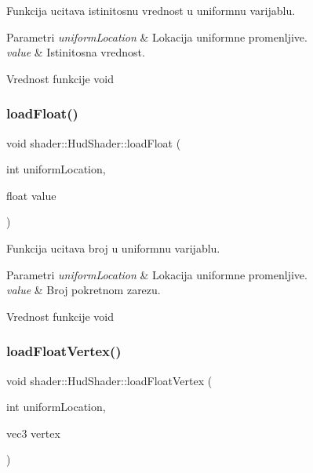Funkcija ucitava istinitosnu vrednost u uniformnu varijablu. 


\begin{DoxyParams}{Parametri}
{\em uniform\+Location} & Lokacija uniformne promenljive. \\
\hline
{\em value} & Istinitosna vrednost. \\
\hline
\end{DoxyParams}
\begin{DoxyReturn}{Vrednost funkcije}
void 
\end{DoxyReturn}
\mbox{\label{classshader_1_1HudShader_ac184470cfd0979bc13fc7571d9e0b310}} 
\subsubsection{\texorpdfstring{load\+Float()}{loadFloat()}}
{\footnotesize\ttfamily void shader\+::\+Hud\+Shader\+::load\+Float (\begin{DoxyParamCaption}\item[{int}]{uniform\+Location,  }\item[{float}]{value }\end{DoxyParamCaption})}



Funkcija ucitava broj u uniformnu varijablu. 


\begin{DoxyParams}{Parametri}
{\em uniform\+Location} & Lokacija uniformne promenljive. \\
\hline
{\em value} & Broj pokretnom zarezu. \\
\hline
\end{DoxyParams}
\begin{DoxyReturn}{Vrednost funkcije}
void 
\end{DoxyReturn}
\mbox{\label{classshader_1_1HudShader_a5bfee0570129124b25d570310b18c5e5}} 
\subsubsection{\texorpdfstring{load\+Float\+Vertex()}{loadFloatVertex()}}
{\footnotesize\ttfamily void shader\+::\+Hud\+Shader\+::load\+Float\+Vertex (\begin{DoxyParamCaption}\item[{int}]{uniform\+Location,  }\item[{vec3}]{vertex }\end{DoxyParamCaption})}



